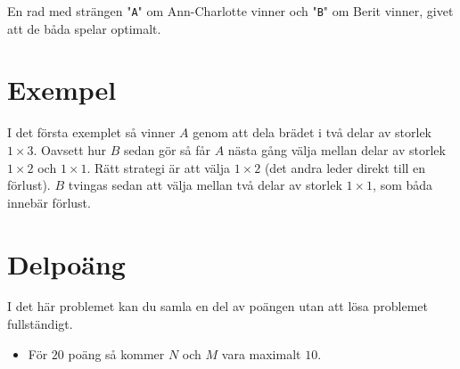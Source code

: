 En rad med strängen "\texttt{A}" om Ann-Charlotte vinner och "\texttt{B}" om
Berit vinner, givet att de båda spelar optimalt.

\section*{Exempel}
I det första exemplet så vinner $A$ genom att dela brädet i två delar av storlek
$1 \times 3$. Oavsett hur $B$ sedan gör så får $A$ nästa gång välja mellan
delar av storlek $1 \times 2$ och $1 \times 1$. Rätt strategi är att välja $1
\times 2$ (det andra leder direkt till en förlust). $B$ tvingas sedan att välja
mellan två delar av storlek $1 \times 1$, som båda innebär förlust.

\section*{Delpoäng}

I det här problemet kan du samla en del av poängen utan att
lösa problemet fullständigt.

\begin{itemize}
    \item För $20$ poäng så kommer $N$ och $M$ vara maximalt $10$.
\end{itemize}
